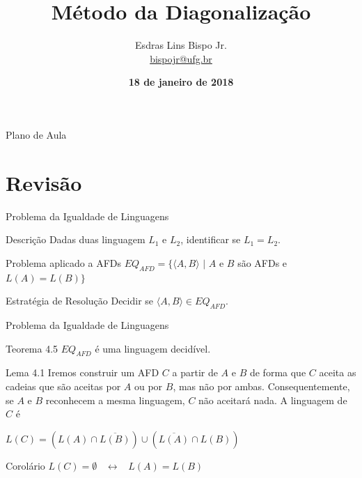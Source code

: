 \documentclass[xcolor=dvipsnames,table]{beamer}
\title{Método da Diagonalização}
\author{
  Esdras Lins Bispo Jr. \\ \url{bispojr@ufg.br}
  }
\institute{
  Teoria da Computação \\Bacharelado em Ciência da Computação}
\date{\textbf{18 de janeiro de 2018} }
\begin{document}
	\begin{frame}
		\titlepage
	\end{frame}

	\AtBeginSection{
		\begin{frame}{Sumário}%
    		\tableofcontents[currentsection]
		\end{frame}
	}

	\begin{frame}{Plano de Aula}
		\tableofcontents
	\end{frame}
	
	
	\section{Revisão}	
	\begin{frame}{Problema da Igualdade de Linguagens}
		\begin{block}{Descrição}
			Dadas duas linguagem $L_1$ e $L_2$, identificar se $L_1 = L_2$.
		\end{block}	 
		\begin{block}{Problema aplicado a AFDs}
			$EQ_{AFD} = \{ \langle A, B \rangle \mbox{ | } A$ e $B$ são AFDs e $L(A) = L(B) \}$
		\end{block}  
		\begin{block}{Estratégia de Resolução}
			Decidir se $\langle A, B \rangle \in EQ_{AFD}$.
		\end{block}
	\end{frame}		
	
	\begin{frame}{Problema da Igualdade de Linguagens}
		\begin{block}{Teorema 4.5}
			$EQ_{AFD}$ é uma linguagem decidível.
		\end{block}  
		\begin{block}{Lema 4.1}
			Iremos construir um AFD $C$ a partir de $A$ e $B$ de forma que $C$ aceita as cadeias que são aceitas por $A$ ou por $B$, mas não por ambas. Consequentemente, se $A$ e $B$ reconhecem a mesma linguagem, $C$ não aceitará nada. A linguagem de $C$ é
			\begin{center}
				$L(C) = \left( L(A) \cap \overline{L(B)} \right) \cup \left( \overline{L(A)} \cap L(B) \right)$
			\end{center}
		\end{block}  
		\begin{block}{Corolário}
			$L(C) = \emptyset$ \ $\leftrightarrow$ \ $L(A) = L(B)$
		\end{block}
	\end{frame}
	
\end{document}
